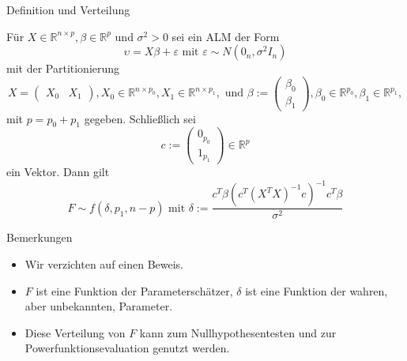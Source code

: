 \documentclass[
  8pt,
  ignorenonframetext,
]{beamer}
\providecommand{\tightlist}{%
  \setlength{\itemsep}{0pt}\setlength{\parskip}{0pt}}
\begin{document}
\begin{frame}{Definition und Verteilung}
\protect\hypertarget{definition-und-verteilung-5}{}
\footnotesize
\begin{theorem}[F-Statistik]
\justifying
\normalfont
Für $X \in \mathbb{R}^{n \times p}, \beta \in \mathbb{R}^p$ und $\sigma^2 > 0$
sei ein ALM der Form
\begin{equation}
\upsilon = X\beta + \varepsilon \mbox{ mit } \varepsilon \sim N(0_n,\sigma^2I_n)
\end{equation}
mit der Partitionierung
\begin{equation}
X      = \begin{pmatrix} X_0     & X_1      \end{pmatrix},
X_0      \in \mathbb{R}^{n\times p_0},
X_1      \in \mathbb{R}^{n\times p_1},
\mbox{ und }
\beta := \begin{pmatrix} \beta_0 \\ \beta_1 \end{pmatrix},
\beta_0 \in \mathbb{R}^{p_0},
\beta_1 \in \mathbb{R}^{p_1},
\end{equation}
mit $p = p_0 + p_1$ gegeben. Schließlich sei
\begin{equation}
c := \begin{pmatrix} 0_{p_0} \\ 1_{p_1} \end{pmatrix} \in \mathbb{R}^p
\end{equation}
ein Vektor. Dann gilt
\begin{equation}
F \sim f(\delta, p_1, n-p) \mbox{ mit } \delta := \frac{c^T\beta \left(c^T(X^TX)^{-1}c\right)^{-1}c^T \beta}{\sigma^2}
\end{equation}
\end{theorem}

Bemerkungen

\begin{itemize}
\tightlist
\item
  Wir verzichten auf einen Beweis.
\item
  \(F\) ist eine Funktion der Parameterschätzer, \(\delta\) ist eine
  Funktion der wahren, aber unbekannten, Parameter.
\item
  Diese Verteilung von \(F\) kann zum Nullhypothesentesten und zur
  Powerfunktionsevaluation genutzt werden.
\end{itemize}
\end{frame}
\end{document}
